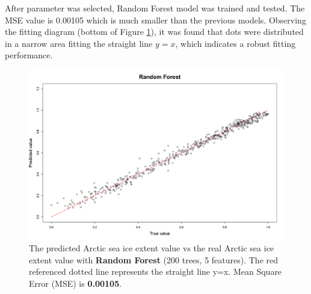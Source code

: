 After parameter was selected, Random Forest model was trained and tested. The MSE value is 0.00105 which is much smaller than the previous models. Observing the fitting diagram (bottom of Figure \ref{4.2.6-RFMSE}), it was found that dots were distributed in a narrow area fitting the straight line $y=x$, which indicates a robust fitting performance.

\begin{figure}[htbp]
\centering
\includegraphics[width = 1.0\textwidth]{Figure/4.2.4-RF.png}
\caption{The predicted Arctic sea ice extent value vs the real Arctic sea ice extent value with \textbf{Random Forest} (200 trees, 5 features). The red referenced dotted line represents the straight line y=x. Mean Square Error (MSE) is \textbf{0.00105}.}
\label{4.2.6-RFMSE}
\end{figure}



\newpage